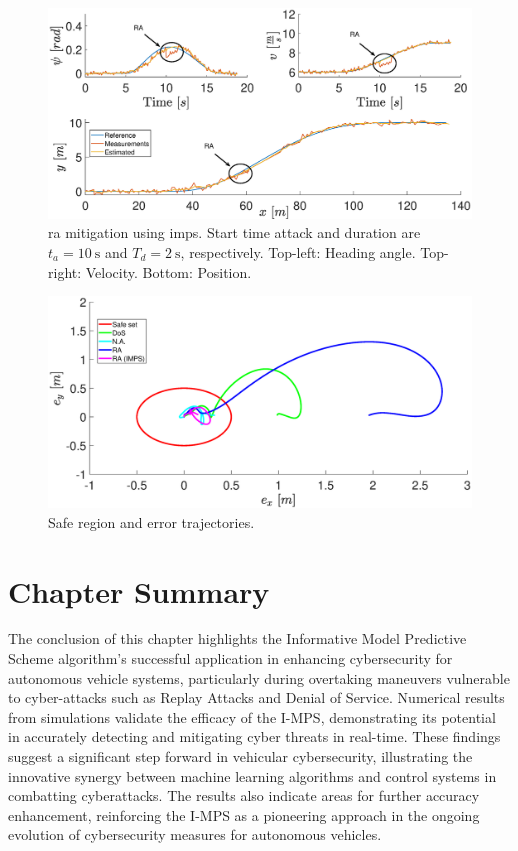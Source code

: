 %


\begin{figure}
	\centering
	\includegraphics[scale=0.4]{figure/Part2/Chapter6/Figures/Mitigation_fin.eps}
	\caption{\gls{ra} mitigation using \gls{imps}. Start time attack and duration are  $t_a= \SI{10}{\second}$ and $T_d=\SI{2}{\second}$, respectively. Top-left: Heading angle. Top-right: Velocity. Bottom: Position.   }
	\label{fig:Simulation_Mitigator}
\end{figure}
%
\begin{figure}
	\centering
	\includegraphics[scale=0.4]{figure/Part2/Chapter6/Figures/Safe_set.eps}
	\caption{Safe region and error trajectories. }
	\label{fig:Safe_set}
\end{figure}
%




\clearpage
\section{Chapter Summary}


The conclusion of this chapter highlights the Informative Model Predictive Scheme algorithm's successful application in enhancing cybersecurity for autonomous vehicle systems, particularly during overtaking maneuvers vulnerable to cyber-attacks such as Replay Attacks and Denial of Service. Numerical results from simulations validate the efficacy of the I-MPS, demonstrating its potential in accurately detecting and mitigating cyber threats in real-time. These findings suggest a significant step forward in vehicular cybersecurity, illustrating the innovative synergy between machine learning algorithms and control systems in combatting cyberattacks. The results also indicate areas for further accuracy enhancement, reinforcing the I-MPS as a pioneering approach in the ongoing evolution of cybersecurity measures for autonomous vehicles.